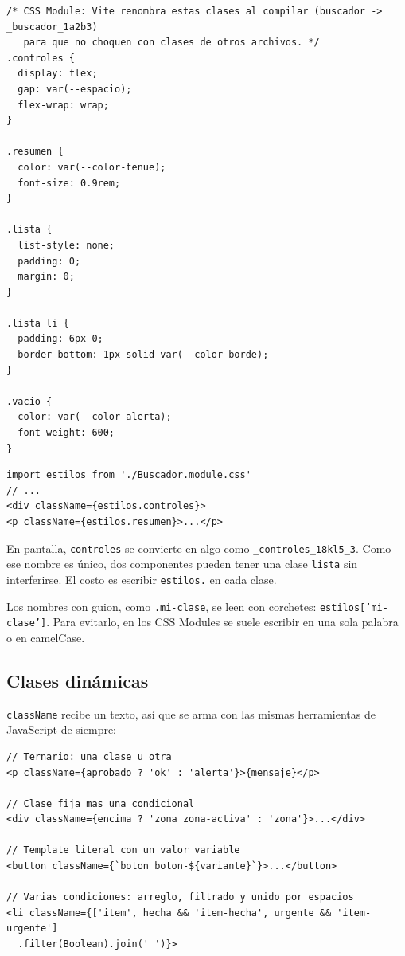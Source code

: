 \documentclass[11pt,a4paper]{article}
\newcommand{\cmd}[1]{\texttt{\color{reactdark}#1}}
\begin{document}
\begin{lstlisting}[language=JSX,title={\small\ttfamily src/components/listas/Buscador.module.css}]
/* CSS Module: Vite renombra estas clases al compilar (buscador -> _buscador_1a2b3)
   para que no choquen con clases de otros archivos. */
.controles {
  display: flex;
  gap: var(--espacio);
  flex-wrap: wrap;
}

.resumen {
  color: var(--color-tenue);
  font-size: 0.9rem;
}

.lista {
  list-style: none;
  padding: 0;
  margin: 0;
}

.lista li {
  padding: 6px 0;
  border-bottom: 1px solid var(--color-borde);
}

.vacio {
  color: var(--color-alerta);
  font-weight: 600;
}
\end{lstlisting}
\begin{lstlisting}[language=JSX]
import estilos from './Buscador.module.css'
// ...
<div className={estilos.controles}>
<p className={estilos.resumen}>...</p>
\end{lstlisting}

En pantalla, \cmd{controles} se convierte en algo como \cmd{\_controles\_18kl5\_3}. Como ese nombre es único, dos componentes pueden tener una clase \cmd{lista} sin interferirse. El costo es escribir \cmd{estilos.} en cada clase.

\begin{nota}
Los nombres con guion, como \cmd{.mi-clase}, se leen con corchetes: \cmd{estilos['mi-clase']}. Para evitarlo, en los CSS Modules se suele escribir en una sola palabra o en camelCase.
\end{nota}

\subsection{Clases dinámicas}

\cmd{className} recibe un texto, así que se arma con las mismas herramientas de JavaScript de siempre:
\begin{lstlisting}[language=JSX]
// Ternario: una clase u otra
<p className={aprobado ? 'ok' : 'alerta'}>{mensaje}</p>

// Clase fija mas una condicional
<div className={encima ? 'zona zona-activa' : 'zona'}>...</div>

// Template literal con un valor variable
<button className={`boton boton-${variante}`}>...</button>

// Varias condiciones: arreglo, filtrado y unido por espacios
<li className={['item', hecha && 'item-hecha', urgente && 'item-urgente']
  .filter(Boolean).join(' ')}>
\end{lstlisting}
\end{document}

